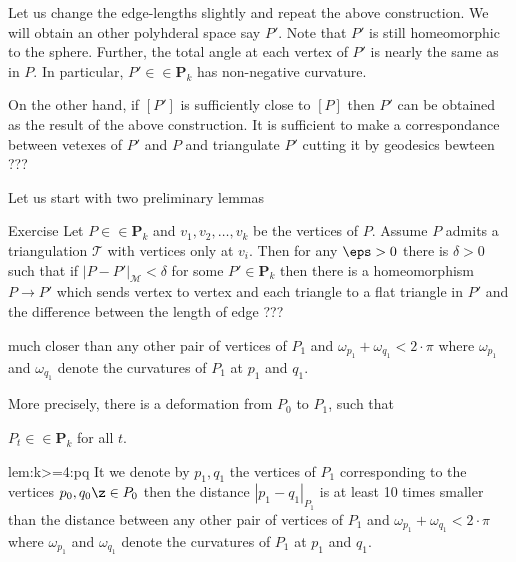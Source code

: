 Let us change the edge-lengths slightly 
and repeat the above construction.
We will obtain an other polyhderal space  say $P'$.
Note that $P'$ is still homeomorphic to the sphere.
Further, the total angle at each vertex of $P'$
is nearly the same as in $P$.
In particular, $P'\in\in\mathbf{P}_k$ has non-negative curvature.

On the other hand, if $[P']$ is sufficiently close to $[P]$
then $P'$ can be obtained as the result of the above construction.
It is sufficient to make a correspondance between vetexes of $P'$ and $P$
and triangulate $P'$ cutting it by geodesics bewteen ??? 
  
Let us start with two preliminary lemmas











\begin{thm}{Exercise}
Let $P\in\in \mathbf{P}_k$ and $v_1,v_2,\dots,v_k$ be the vertices of $P$.
Assume $P$ admits a triangulation $\mathcal{T}$ with vertices only at $v_i$.
Then for any $\eps>0$ there is $\delta>0$ such that if 
$|P-P'|_\mathcal{M}<\delta$ for some
$P'\in \mathbf{P}_k$ then
there is a homeomorphism $P\to P'$ which sends vertex to vertex and 
each triangle to a flat triangle in $P'$
and the difference between the length of edge ???
\end{thm}




much closer than any other pair of vertices of $P_1$ and $\omega_{p_1}+\omega_{q_1}<2\cdot \pi$
where $\omega_{p_1}$ and $\omega_{q_1}$ denote the curvatures of $P_1$ at $p_1$ and $q_1$.

More precisely, there is a deformation from $P_0$ to $P_1$, such that 
\begin{subthm}{}
$P_t\in\in \mathbf{P}_{k}$ for all $t$.
\end{subthm}

\begin{subthm}{lem:k>=4:pq}
It we denote by $p_1,q_1$
the vertices of $P_1$
corresponding to the vertices 
$p_0,q_0\z\in P_0$
then the distance $|p_1-q_1|_{P_1}$ is at least 10 times smaller than the distance between any other pair of vertices of $P_1$
and
$\omega_{p_1}+\omega_{q_1}<2\cdot \pi$
where $\omega_{p_1}$ and $\omega_{q_1}$ denote the curvatures of $P_1$ at $p_1$ and $q_1$.
\end{subthm}









